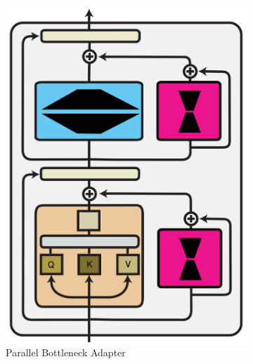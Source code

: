 \documentclass[10pt]{article} %
\begin{document}
\begin{figure}[t]
\begin{subfigure}[b]{.3\linewidth}
        \includegraphics[width=.6\linewidth]{img/Parallel_adapter.pdf}  
        \vspace{1.4em}
        \caption{Parallel Bottleneck Adapter}
    \label{fig:nature_modularity:paralleladapter}
    \end{subfigure}
    \begin{subfigure}[b]{.3\linewidth}
    \centering
    

\end{subfigure}
\end{figure}
\end{document}
